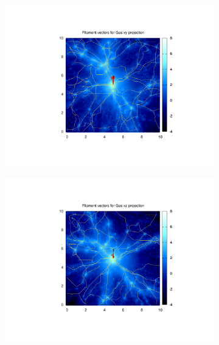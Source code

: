 \documentclass[journal]{IEEEtran}
\begin{document}
\begin{figure}[!t]
\centering
	\begin{subfigure}[t]{0.3\textwidth}
		\centering
		\includegraphics[width=\linewidth]{Filxy.pdf}
	\end{subfigure}
	\quad
	\begin{subfigure}[t]{0.3\textwidth}
		\centering
		\includegraphics[width=\linewidth]{Filxz.pdf}
	\end{subfigure}
	\quad
	\begin{subfigure}[t]{0.3\textwidth}
		\centering

\end{subfigure}
\end{figure}
\end{document}
